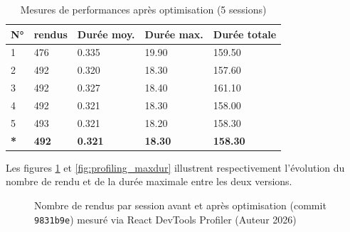 \begin{table}[H]
    \centering
    \caption{Mesures de performances après optimisation (5 sessions)}
    \renewcommand{\arraystretch}{1.5}
    \begin{tabular}{p{0.8cm} p{2.5cm} p{2.5cm} p{2.5cm} p{2.7cm}}
        \hline
        \textbf{N°} & \textbf{\Glspl{rendu}} & \textbf{Durée moy.} & \textbf{Durée max.} & \textbf{Durée totale} \\
        \hline
        1 & 476 & 0.335 & 19.90 & 159.50 \\
        2 & 492 & 0.320 & 18.30 & 157.60 \\
        3 & 492 & 0.327 & 18.40 & 161.10 \\
        4 & 492 & 0.321 & 18.30 & 158.00 \\
        5 & 493 & 0.321 & 18.20 & 158.30 \\
        \hline
        \textbf{*} & \textbf{492} & \textbf{0.321} & \textbf{18.30} & \textbf{158.30} \\
        \hline
    \end{tabular}
    \par{}
    \label{tab:profiling_after}
\end{table}

Les figures \ref{fig:profiling_renders} et \ref{fig:profiling_maxdur} illustrent respectivement l'évolution du nombre de \gls{rendu} et de la durée maximale entre les deux versions.

\begin{figure}[H]
    \centering
    \caption{Nombre de \glspl{rendu} par session avant et après optimisation (commit \texttt{9831b9e}) mesuré via React DevTools Profiler (Auteur 2026)}
    \label{fig:profiling_renders}
\end{figure}

